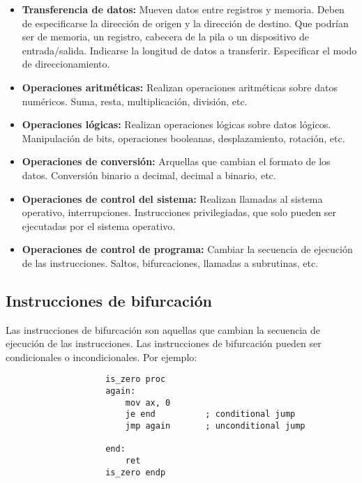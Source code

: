 \documentclass{article}
\begin{document}
\begin{itemize}
    \item \textbf{Transferencia de datos:}
          Mueven datos entre registros y memoria. Deben de especificarse
          la direcci\'{o}n de origen y la direcci\'{o}n de destino. Que
          podr\'{i}an ser de memoria, un registro, cabecera de la pila o
          un dispositivo de entrada/salida. Indicarse la longitud de datos
          a transferir. Especificar el modo de direccionamiento.

    \item \textbf{Operaciones aritm\'{e}ticas:}
          Realizan operaciones aritm\'{e}ticas sobre datos num\'{e}ricos.
          Suma, resta, multiplicaci\'{o}n, divisi\'{o}n, etc.

    \item \textbf{Operaciones l\'{o}gicas:}
          Realizan operaciones l\'{o}gicas sobre datos l\'{o}gicos.
          Manipulaci\'{o}n de bits, operaciones booleanas, desplazamiento,
          rotaci\'{o}n, etc.

    \item \textbf{Operaciones de conversi\'{o}n:}
          Arquellas que cambian el formato de los datos. Conversi\'{o}n
          binario a decimal, decimal a binario, etc.

    \item \textbf{Operaciones de control del sistema:}
          Realizan llamadas al sistema operativo, interrupciones.
          Instrucciones privilegiadas, que solo pueden ser ejecutadas
          por el sistema operativo.

    \item \textbf{Operaciones de control de programa:}
          Cambiar la secuencia de ejecuci\'{o}n de las instrucciones.
          Saltos, bifurcaciones, llamadas a subrutinas, etc.
\end{itemize}

\subsection*{Instrucciones de bifurcaci\'{o}n}
Las instrucciones de bifurcaci\'{o}n son aquellas que cambian la secuencia
de ejecuci\'{o}n de las instrucciones. Las instrucciones de bifurcaci\'{o}n
pueden ser condicionales o incondicionales. Por ejemplo:

\begin{verbatim}
                    is_zero proc
                    again:
                        mov ax, 0
                        je end          ; conditional jump
                        jmp again       ; unconditional jump
                    
                    end:
                        ret
                    is_zero endp
\end{verbatim}
\end{document}
